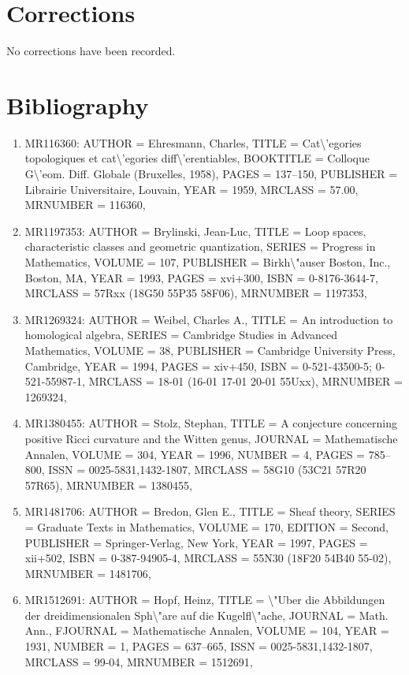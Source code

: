 \documentclass[11pt]{article}
\begin{document}
\section*{Corrections}
No corrections have been recorded.

\section*{Bibliography}
\begin{enumerate}[leftmargin=*]
  \item MR116360: AUTHOR = Ehresmann, Charles, TITLE = Cat\textbackslash{}'egories topologiques et cat\textbackslash{}'egories diff\textbackslash{}'erentiables, BOOKTITLE = Colloque G\textbackslash{}'eom. Diff. Globale (Bruxelles, 1958), PAGES = 137--150, PUBLISHER = Librairie Universitaire, Louvain, YEAR = 1959, MRCLASS = 57.00, MRNUMBER = 116360,
  \item MR1197353: AUTHOR = Brylinski, Jean-Luc, TITLE = Loop spaces, characteristic classes and geometric quantization, SERIES = Progress in Mathematics, VOLUME = 107, PUBLISHER = Birkh\textbackslash{}"auser Boston, Inc., Boston, MA, YEAR = 1993, PAGES = xvi+300, ISBN = 0-8176-3644-7, MRCLASS = 57Rxx (18G50 55P35 58F06), MRNUMBER = 1197353,
  \item MR1269324: AUTHOR = Weibel, Charles A., TITLE = An introduction to homological algebra, SERIES = Cambridge Studies in Advanced Mathematics, VOLUME = 38, PUBLISHER = Cambridge University Press, Cambridge, YEAR = 1994, PAGES = xiv+450, ISBN = 0-521-43500-5; 0-521-55987-1, MRCLASS = 18-01 (16-01 17-01 20-01 55Uxx), MRNUMBER = 1269324,
  \item MR1380455: AUTHOR = Stolz, Stephan, TITLE = A conjecture concerning positive Ricci curvature and the Witten genus, JOURNAL = Mathematische Annalen, VOLUME = 304, YEAR = 1996, NUMBER = 4, PAGES = 785--800, ISSN = 0025-5831,1432-1807, MRCLASS = 58G10 (53C21 57R20 57R65), MRNUMBER = 1380455,
  \item MR1481706: AUTHOR = Bredon, Glen E., TITLE = Sheaf theory, SERIES = Graduate Texts in Mathematics, VOLUME = 170, EDITION = Second, PUBLISHER = Springer-Verlag, New York, YEAR = 1997, PAGES = xii+502, ISBN = 0-387-94905-4, MRCLASS = 55N30 (18F20 54B40 55-02), MRNUMBER = 1481706,
  \item MR1512691: AUTHOR = Hopf, Heinz, TITLE = \textbackslash{}"Uber die Abbildungen der dreidimensionalen Sph\textbackslash{}"are auf die Kugelfl\textbackslash{}"ache, JOURNAL = Math. Ann., FJOURNAL = Mathematische Annalen, VOLUME = 104, YEAR = 1931, NUMBER = 1, PAGES = 637--665, ISSN = 0025-5831,1432-1807, MRCLASS = 99-04, MRNUMBER = 1512691,

\end{enumerate}
\end{document}
